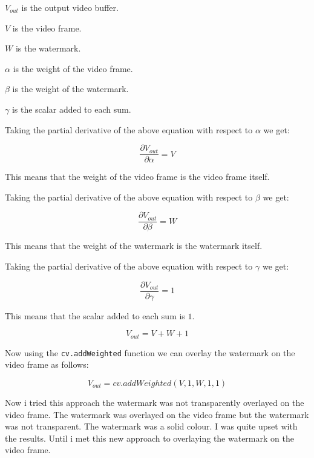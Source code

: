 \documentclass[ebook,12pt,oneside,openany]{memoir}
\begin{document}
$V_{out}$ is the output video buffer.

$V$ is the video frame.

$W$ is the watermark.

$\alpha$ is the weight of the video frame.

$\beta$ is the weight of the watermark.

$\gamma$ is the scalar added to each sum.

Taking the partial derivative of the above equation with respect to $\alpha$ we get:

\begin{equation}
\frac{\partial V_{out}}{\partial \alpha} = V
\end{equation}

This means that the weight of the video frame is the video frame itself.

Taking the partial derivative of the above equation with respect to $\beta$ we get:

\begin{equation}
\frac{\partial V_{out}}{\partial \beta} = W
\end{equation}

This means that the weight of the watermark is the watermark itself.

Taking the partial derivative of the above equation with respect to $\gamma$ we get:

\begin{equation}
\frac{\partial V_{out}}{\partial \gamma} = 1
\end{equation}

This means that the scalar added to each sum is $1$.

\begin{equation}
V_{out} = V + W + 1
\end{equation}


Now using the \verb|cv.addWeighted| function we can overlay the watermark on the video frame as follows:

\begin{equation}
V_{out} = cv.addWeighted(V, 1, W, 1, 1)
\end{equation}

Now i tried this approach the watermark was not transparently overlayed on the video frame. The watermark was overlayed on the video frame but the watermark was not transparent. The watermark was a solid colour. I was quite 
upset with the results. Until i met this new approach to overlaying the watermark on the video frame.
\end{document}
